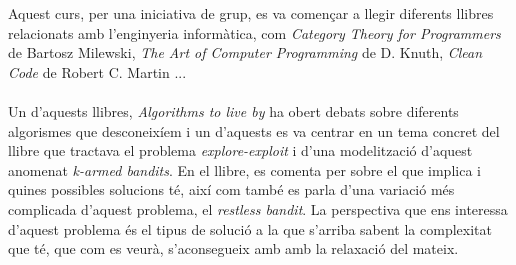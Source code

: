 
		Aquest curs, per una iniciativa de grup, es va començar a llegir diferents llibres relacionats amb l'enginyeria informàtica, com 
		\textit{Category Theory for Programmers} de Bartosz Milewski, \textit{The Art of Computer Programming}  de D. Knuth, 
		\textit{Clean Code} de Robert C. Martin \cite{catteo,knuth,clean}...\\
		\\
		Un d'aquests llibres, \textit{Algorithms to live by} \cite{alg2liveby}
		ha obert debats sobre diferents algorismes que desconeixíem i un d'aquests es va centrar en un tema concret del llibre que tractava el problema \textit{explore-exploit} i d'una modelització d'aquest anomenat \textit{k-armed bandits}. En el llibre, es comenta per sobre el que implica i quines possibles solucions té, així com també es parla d'una variació més complicada d'aquest problema, el  \textit{restless bandit}. La perspectiva que ens interessa d'aquest problema és el tipus de solució a la que s'arriba sabent la complexitat que té, que com es veurà, s'aconsegueix amb amb la relaxació del mateix.  %
